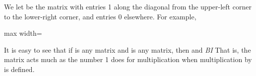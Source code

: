 \documentclass[11pt,oneside]{article}
\begin{document}
\begin{BookBody}
We let  be the  matrix with entries 1 along the diagonal from the upper-left corner to the lower-right corner, and entries 0 elsewhere. For example,

\begin{center}\begin{adjustbox}{max width=\linewidth}\end{adjustbox}\end{center}

\noindent It is easy to see that if  is any  matrix and  is any  matrix, then  and \textit{BI} That is, the matrix  acts much as the number 1 does for multiplication when multiplication by  is defined.

\end{BookBody}

\BookNarrativetrue
\end{document}
